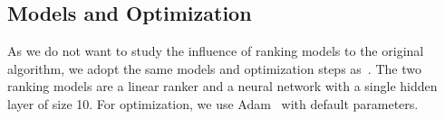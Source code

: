 \subsection{Models and Optimization}
As we do not want to study the influence of ranking models to the original algorithm, we adopt the same models and optimization steps as~\cite{kharitonov2019federated}. The two ranking models are a linear ranker and a neural network with a single hidden layer of size 10. For optimization, we use Adam~\cite{kingma2014adam} with default parameters.

